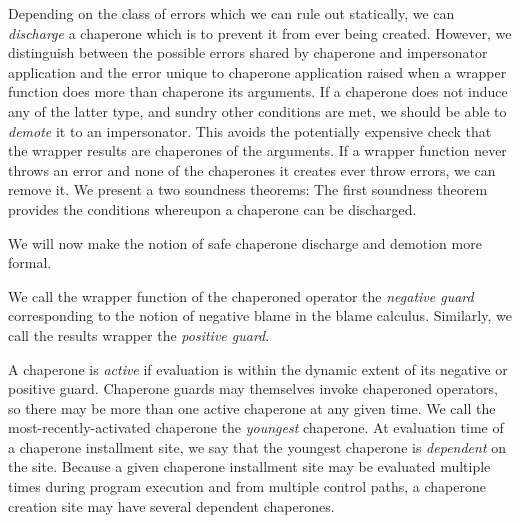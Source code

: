 \documentclass{sigplanconf}
\begin{document}
Depending on the class of errors which we can rule out statically, we can \emph{discharge} a chaperone which is to prevent it from ever being created.
However, we distinguish between the possible errors shared by chaperone and impersonator application and the error unique to chaperone application raised when a wrapper function does more than chaperone its arguments.
If a chaperone does not induce any of the latter type, and sundry other conditions are met, we should be able to \emph{demote} it to an impersonator.
This avoids the potentially expensive check that the wrapper results are chaperones of the arguments.
If a wrapper function never throws an error and none of the chaperones it creates ever throw errors, we can remove it.
We present a two soundness theorems:
The first soundness theorem provides the conditions whereupon a chaperone can be discharged.

We will now make the notion of safe chaperone discharge and demotion more formal.

We call the wrapper function of the chaperoned operator the \emph{negative guard} corresponding to the notion of negative blame in the blame calculus.
Similarly, we call the results wrapper the \emph{positive guard}.

A chaperone is \emph{active} if evaluation is within the dynamic extent of its negative or positive guard.
Chaperone guards may themselves invoke chaperoned operators, so there may be more than one active chaperone at any given time.
We call the most-recently-activated chaperone the \emph{youngest} chaperone.
At evaluation time of a chaperone installment site, we say that the youngest chaperone is \emph{dependent} on the site.
Because a given chaperone installment site may be evaluated multiple times during program execution and from multiple control paths, a chaperone creation site may have several dependent chaperones.

\end{document}
